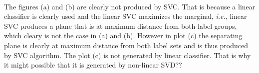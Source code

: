 \documentclass[article,11pt]{article}
\begin{document}
	\begin{figure}[ht!]
		\begin{center}
		\end{center}
	\end{figure}
\\
The figures (a) and (b) are clearly not produced by SVC. That is because a
linear classifier is clearly used and the linear SVC
maximizes the marginal, \textit{i.e.}, linear SVC produces a plane that is at
maximum distance from both label groups, which cleary is not the case in (a)
and (b). However in plot (c) the separating plane is clearly at maximum
distance from both label sets and is thus produced by SVC algorithm. The plot
(c) is not generated by linear classifier. That is why it might possible
that it is generated by non-linear SVD??
\end{document}
